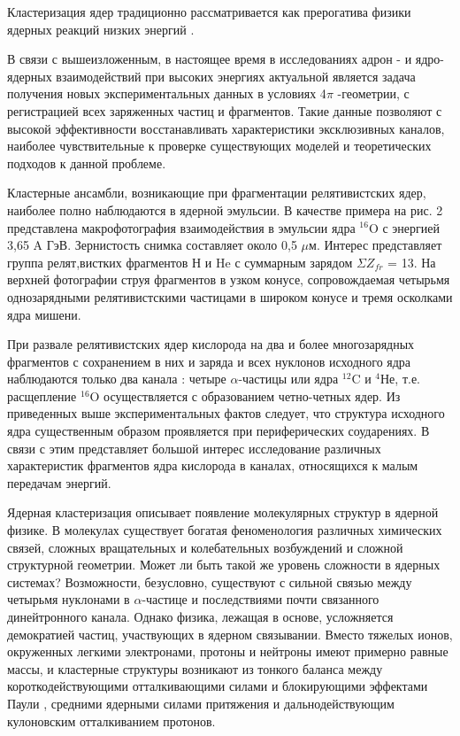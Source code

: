 \documentclass[fontsize=14pt]{scrreport}
\begin{document}
Кластеризация ядер традиционно рассматривается как прерогатива физики ядерных реакций низких энергий \cite{3}.

В связи с вышеизложенным, в настоящее время в исследованиях адрон - и ядро-ядерных взаимодействий при высоких энергиях актуальной является задача получения новых экспериментальных данных в условиях 4$\pi$ -геометрии, с регистрацией всех заряженных частиц и фрагментов. Такие данные позволяют с высокой эффективности восстанавливать характеристики эксклюзивных каналов, наиболее чувствительные к проверке существующих моделей и теоретических подходов к данной проблеме. 

Кластерные ансамбли, возникающие при фрагментации релятивистских ядер, наиболее полно наблюдаются в ядерной эмульсии. В качестве примера на рис. 2 представлена макрофотография взаимодействия в эмульсии ядра $^{16}$O с энергией 3,65 A ГэВ. Зернистость снимка составляет около 0,5 $\mu$м. Интерес представляет группа релят,вистких фрагментов Н и He с суммарным зарядом $\Sigma Z_{fr}$ = 13. На верхней фотографии струя фрагментов в узком конусе, сопровождаемая четырьмя однозарядными релятивистскими частицами в широком конусе и тремя осколками ядра мишени. 

При развале релятивистских ядер кислорода на два и более многозарядных фрагментов с сохранением в них и заряда и всех нуклонов исходного ядра наблюдаются только два канала \cite{6}: четыре $\alpha$-частицы или ядра $^{12}$C  и $^{4}$Не, т.е. расщепление $^{16}$O  осуществляется с образованием четно-четных ядер. Из приведенных выше экспериментальных фактов следует, что структура исходного ядра существенным образом проявляется при периферических соударениях. В связи с этим представляет большой интерес исследование различных характеристик фрагментов ядра кислорода в каналах, относящихся к малым передачам энергий.
	
Ядерная кластеризация описывает появление молекулярных структур в ядерной физике. В молекулах существует богатая феноменология различных химических связей, сложных вращательных и колебательных возбуждений и сложной структурной геометрии. Может ли быть такой же уровень сложности в ядерных системах? Возможности, безусловно, существуют с сильной связью между четырьмя нуклонами в $\alpha$-частице и последствиями почти связанного динейтронного канала. Однако физика, лежащая в основе, усложняется демократией частиц, участвующих в ядерном связывании. Вместо тяжелых ионов, окруженных легкими электронами, протоны и нейтроны имеют примерно равные массы, и кластерные структуры возникают из тонкого баланса между короткодействующими отталкивающими силами и блокирующими эффектами Паули , средними ядерными силами притяжения и дальнодействующим кулоновским отталкиванием протонов. 
	
\end{document}
